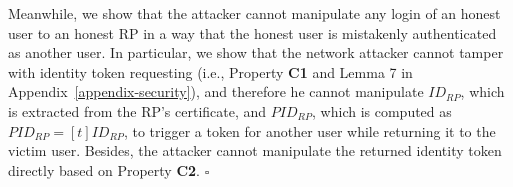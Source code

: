 Meanwhile, we show that the attacker cannot manipulate any login of an honest user to an honest RP in a way that the honest user is mistakenly authenticated as another user. 
In particular, we show that the network attacker cannot tamper with identity token requesting (i.e., Property \textbf{C1} and Lemma 7 in Appendix~\ref{appendix-security}), and therefore he cannot manipulate $ID_{RP}$, which is extracted from the RP's certificate, and $PID_{RP}$, which is computed as $PID_{RP}=[t]ID_{RP}$, to trigger a token for another user while returning it to the victim user. Besides, the attacker cannot manipulate the returned identity token directly based on Property \textbf{C2}. 
\hfill $\square$

